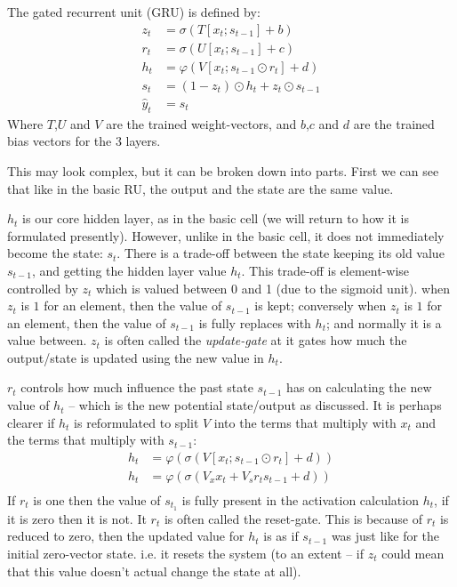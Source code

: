 \documentclass[12pt,parskip]{komatufte}
\begin{document}
The gated recurrent unit (GRU) is defined by:
\begin{align}
z_t &= \sigma \left( T[x_t; s_{t-1}] + b \right) \\
r_t &= \sigma \left( U[x_t; s_{t-1}] + c \right) \\
h_t &= \varphi \left(  V[x_t; s_{t-1} \odot r_t] + d \right)  \\
s_t &= (1-z_t) \odot h_t + z_t\odot s_{t-1}\\
\hat{y}_t &= s_t
\end{align}
Where $T$,$U$ and $V$ are the trained weight-vectors, and $b$,$c$ and $d$ are the trained bias vectors for the 3 layers.


This may look complex, but it can be broken down into parts.
First we can see that like in the basic RU, the output and the state are the same value.

$h_t$ is our core hidden layer, as in the basic cell (we will return to how it is formulated presently).
However, unlike in the basic cell, it does not immediately become the state: $s_t$.
There is a trade-off between the state keeping its old value $s_{t-1}$, and getting the hidden layer value $h_t$.
This trade-off is element-wise controlled by $z_t$ which is valued between 0 and 1 (due to the sigmoid unit).
when $z_t$ is $1$ for an element, then the value of $s_{t-1}$ is kept;
conversely when $z_t$ is $1$ for an element, then the value of $s_{t-1}$ is fully replaces with $h_t$;
and normally it is a value between.
$z_t$ is often called the \emph{update-gate} at it gates how much the output/state is updated using the new value in $h_t$.


$r_t$ controls how much influence the past state $s_{t-1}$ has on calculating the new value of $h_t$ -- which is the new potential state/output as discussed.
It is perhaps clearer if $h_t$ is reformulated to split $V$ into the terms that multiply with $x_t$ and the terms that multiply with $s_{t-1}$:
\begin{align}
h_t &= \varphi \left( \sigma \left( V[x_t; s_{t-1} \odot r_t] + d \right) \right) \\
h_t &= \varphi \left( \sigma \left( V_x x_t + V_s r_t s_{t-1} + d \right) \right) \\
\end{align}
If $r_t$ is one then the value of $s_{t_1}$ is fully present in the activation calculation $h_t$, if it is zero then it is not.
It $r_t$ is often called the reset-gate.
This is because of $r_t$ is reduced to zero, then the updated value for $h_t$ is as if $s_{t-1}$ was just like for the initial zero-vector state.
i.e. it resets the system (to an extent -- if $z_t$ could mean that this value doesn't actual change the state at all).
\end{document}
